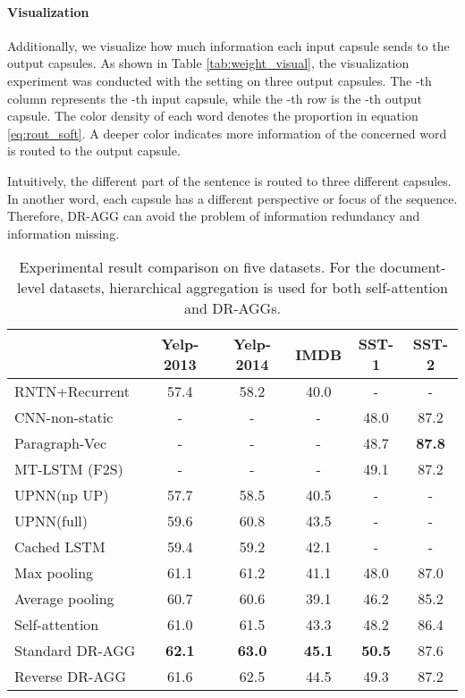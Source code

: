 \documentclass[11pt]{article}
\begin{document}
\paragraph{Visualization}
Additionally, we visualize how much information each input capsule sends to the output capsules. As shown in Table \ref{tab:weight_visual}, the visualization experiment was conducted with the setting on three output capsules. 
The -th column represents the -th input capsule, while the -th row is the -th output capsule. The color density of each word denotes the proportion  in equation \ref{eq:rout_soft}.  
A deeper color indicates more information of the concerned word is routed to the output capsule.

Intuitively, the different part of the sentence is routed to three different capsules. In another word, each capsule has a different perspective or focus of the sequence. Therefore, DR-AGG can avoid  the problem of information redundancy and information missing.

\label{exp}

\begin{table}[t!] \centering \begin{tabular}{lccccc}
    \toprule
&\textbf{Yelp-2013} &\textbf{Yelp-2014} &\textbf{IMDB} & \textbf{SST-1}  &\textbf{SST-2}  \\
    \midrule
RNTN+Recurrent~\cite{socher2013recursive} &57.4	&58.2	&40.0	&-	&-	\\
CNN-non-static~\cite{kim2014convolutional}&-		&-		&- 		&48.0	&87.2	 \\
Paragraph-Vec~\cite{le2014distributed}  	& -		& - 	& - 	& 48.7 & \textbf{87.8}   \\
MT-LSTM (F2S)~\cite{DBLP:conf/emnlp/LiuQCWH15} &- &- 	&- 		&49.1 	&87.2  \\
UPNN(np UP)~\cite{tang2015learning} 		&57.7	&58.5	&40.5	&- 	&-  \\
UPNN(full)~\cite{tang2015learning} 		& 59.6	&60.8 	& 43.5 &-  &-   \\
Cached LSTM~\cite{DBLP:journals/corr/XuCQH16}  &59.4  &59.2  &42.1  &- &-  \\
\midrule
Max pooling         	&61.1              &61.2              &41.1              &48.0               &87.0      \\
Average pooling         &60.7              &60.6              &39.1              &46.2               &85.2      \\
Self-attention       &61.0              &61.5 		 	   &43.3 			   &48.2		         &86.4		 \\

\midrule
Standard DR-AGG         &\textbf{62.1} &\textbf{63.0} &\textbf{45.1} &\textbf{50.5}  &87.6 \\
Reverse DR-AGG &61.6          &62.5          &44.5          &49.3 			 &87.2 \\
    \bottomrule
\end{tabular}
\caption{Experimental result comparison on five datasets. For the document-level datasets, hierarchical aggregation is used for both self-attention and DR-AGGs.}
\label{tab:results}
\end{table}
\end{document}
